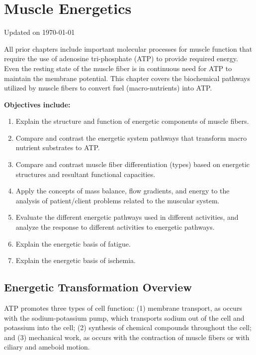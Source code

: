\chapter{Muscle Energetics}\label{chp:energetics}
Updated on \today
\minitoc

All prior chapters include important molecular processes for muscle function that require the use of adenosine tri-phosphate (ATP) to provide required energy. Even the resting state of the muscle fiber is in continuous need for ATP to maintain the membrane potential. This chapter covers the biochemical pathways utilized by muscle fibers to convert fuel (macro-nutrients) into ATP.

\vspace{5mm}

\textbf{Objectives include:}
\begin{enumerate}
    \item Explain the structure and function of energetic components of muscle fibers.
    \item Compare and contrast the energetic system pathways that transform macro nutrient substrates to ATP.
    \item Compare and contrast muscle fiber differentiation (types) based on energetic structures and resultant functional capacities.
    \item  Apply the concepts of mass balance, flow gradients, and energy to the analysis of patient/client problems related to the muscular system.
     \item Evaluate the different energetic pathways used in different activities, and analyze the response to different activities to energetic pathways.
     \item Explain the energetic basis of fatigue.
     \item Explain the energetic basis of ischemia.
\end{enumerate}

\section{Energetic Transformation Overview}


ATP promotes three types of cell function: (1) membrane transport, as occurs with the sodium-potassium pump, which transports sodium out of the cell and potassium into the cell; (2) synthesis of chemical compounds throughout the cell; and (3) mechanical work, as occurs with the contraction of muscle fibers or with ciliary and ameboid motion.


